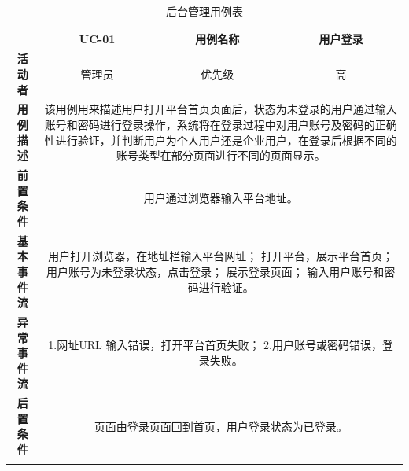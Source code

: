 \begin{longtable}[c]{c|ccc}
	\caption{后台管理用例表}
	\label{tab:tab15}\\
	\shline
	\multicolumn{1}{c|}{\textbf{用例编号}} & \multicolumn{1}{c|}{UC-01} & \multicolumn{1}{c|}{用例名称} &  用户登录\\ \hline
	\endhead
	\multicolumn{1}{c|}{\textbf{活动者}} & \multicolumn{1}{c|}{管理员} & \multicolumn{1}{c|}{优先级} &高  \\ \hline
	\textbf{用例描述} & \multicolumn{3}{p{12cm}}{该用例用来描述用户打开平台首页页面后，状态为未登录的用户通过输入账号和密码进行登录操作，系统将在登录过程中对用户账号及密码的正确性进行验证，并判断用户为个人用户还是企业用户，在登录后根据不同的账号类型在部分页面进行不同的页面显示。} \\ \hline
	\textbf{前置条件}& \multicolumn{3}{p{12cm}}{用户通过浏览器输入平台地址。} \\ \hline
	\textbf{基本事件流}& \multicolumn{3}{p{12cm}}{用户打开浏览器，在地址栏输入平台网址；\newline
		打开平台，展示平台首页；\newline
		用户账号为未登录状态，点击登录；\newline
		展示登录页面；\newline
		输入用户账号和密码进行验证。} \\ \hline
	\textbf{异常事件流}& \multicolumn{3}{p{12cm}}{1.网址URL 输入错误，打开平台首页失败；\newline
		2.用户账号或密码错误，登录失败。
	} \\ \hline
	\textbf{后置条件}& \multicolumn{3}{p{12cm}}{页面由登录页面回到首页，用户登录状态为已登录。} \\ \shline
\end{longtable}